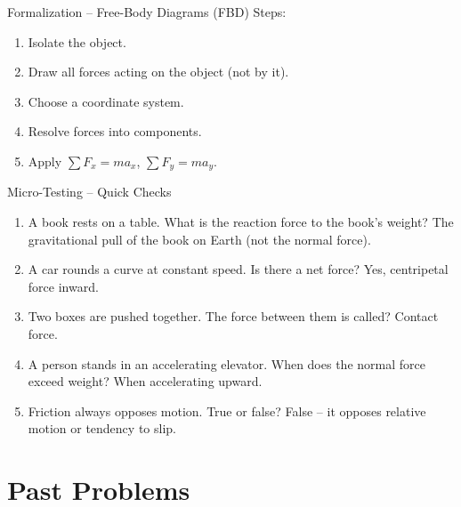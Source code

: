 \documentclass[11pt]{beamer}
\begin{document}
\begin{frame}{Formalization – Free-Body Diagrams (FBD)}
Steps:
\begin{enumerate}
    \item Isolate the object.
    \item Draw all forces acting \alert{on} the object (not by it).
    \item Choose a coordinate system.
    \item Resolve forces into components.
    \item Apply $\sum F_x = m a_x$, $\sum F_y = m a_y$.
\end{enumerate}
\vfill
\centering
{}
\end{frame}

\begin{frame}{Micro-Testing – Quick Checks}
\begin{enumerate}
    \item A book rests on a table. What is the reaction force to the book's weight? \pause \alert{The gravitational pull of the book on Earth (not the normal force)}.
    \item A car rounds a curve at constant speed. Is there a net force? \pause \alert{Yes, centripetal force inward.}
    \item Two boxes are pushed together. The force between them is called? \pause \alert{Contact force.}
    \item A person stands in an accelerating elevator. When does the normal force exceed weight? \pause \alert{When accelerating upward.}
    \item Friction always opposes motion. True or false? \pause \alert{False – it opposes relative motion or tendency to slip.}
\end{enumerate}
\end{frame}

\section{Past Problems}

\end{document}

